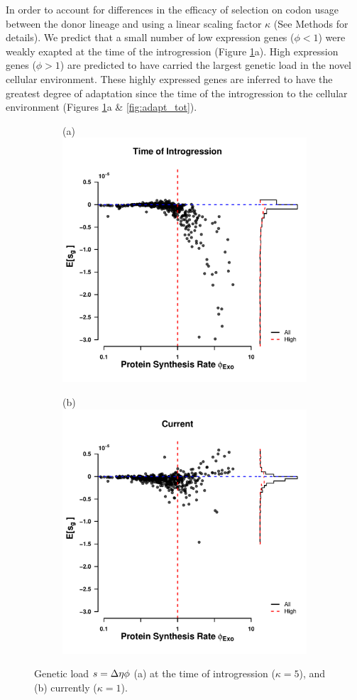 \documentclass[fleqn,letterpaper]{article}
\begin{document}
In order to account for differences in the efficacy of selection on codon usage between the donor lineage and \kluyveri using a linear scaling factor $\kappa$ (See Methods for details).
We predict that a small number of low expression genes ($\phi < 1$) were weakly exapted at the time of the introgression (Figure \ref{fig:sne_fitness_burden}a).
High expression genes ($\phi > 1$) are predicted to have carried the largest genetic load in the novel cellular environment.
These highly expressed genes are inferred to have the greatest degree of adaptation since the time of the introgression to the \kluyveri cellular environment (Figures \ref{fig:sne_fitness_burden}a \& \ref{fig:adapt_tot}).

\begin{figure}
    \centering
    \begin{subfigure}
        \centering
        (a) \includegraphics[width=.45\textwidth]{img/fitness_difference_gos_kappa5.pdf}
    \end{subfigure}
    \begin{subfigure}
        \centering
        (b) \includegraphics[width=.45\textwidth]{img/fitness_difference_exo.pdf}
    \end{subfigure}
    \caption{Genetic load $s = {\Delta \eta} \phi$ (a) at the time of introgression ($\kappa = 5$), and (b) currently ($\kappa = 1$). }
    \label{fig:sne_fitness_burden}
\end{figure}
\end{document}
